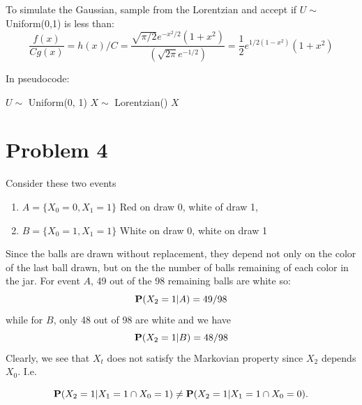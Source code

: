 \documentclass{homework}
\begin{document}
\begin{letterenum}
\item To simulate the Gaussian, sample from the Lorentzian and accept
if $U \sim $ Uniform(0,1) is less than:
\begin{equation*}
    \frac{f(x)}{Cg(x)} = h(x) / C = \frac{\sqrt{\pi/2} e^{-x^2/2}( 1+ x^2)}
                                          {(\sqrt{2\pi} e^{-1/2})}
        = \frac{1}{2} e^{1/2(1 - x^2)}(1 + x^2)
\end{equation*}

In pseudocode:
\begin{algorithmic}
    \Loop
        \State $U \sim$ Uniform(0, 1)
        \State $X \sim $ Lorentzian()
            \State \Return $X$
        \EndIf
    \EndLoop
\end{algorithmic}
\end{letterenum}

\section{Problem 4}
Consider these two events
\begin{enumerate}
    \item $A = \{X_0=0, X_1=1\}$ Red on draw 0, white of draw 1,
    \item $B = \{X_0=1, X_1=1\}$ White on draw 0, white on draw 1
\end{enumerate}

Since the balls are drawn without replacement, they depend not only on the color
of the last ball drawn, but on the the number
of balls remaining of each color in the jar. For event $A$, 49 out of the 98
remaining balls are white so:
\begin{equation*}
    {\bf P}(X_2 = 1 | A) = 49/98
\end{equation*}
while for $B$, only 48 out of 98 are white and we have
\begin{equation*}
    {\bf P}(X_2 = 1 | B) = 48/98
\end{equation*}
Clearly, we see that $X_t$ does not satisfy the Markovian property
since $X_2$ depends $X_0$. I.e.

\begin{equation*}
    {\bf P}(X_2=1 | X_1 = 1 \cap X_0 = 1) \neq {\bf P}(X_2=1 | X_1 = 1 \cap X_0 = 0).
\end{equation*}
\end{document}

